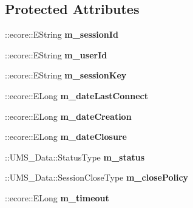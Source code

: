 \subsection*{Protected Attributes}
\begin{DoxyCompactItemize}
\item 
\hypertarget{classUMS__Data_1_1Session_a818bddf0c1cd06b4d1479383e20f8fe5}{
::ecore::EString {\bfseries m\_\-sessionId}}
\label{classUMS__Data_1_1Session_a818bddf0c1cd06b4d1479383e20f8fe5}

\item 
\hypertarget{classUMS__Data_1_1Session_adfed520cb5a119a166a1309a6a797b3b}{
::ecore::EString {\bfseries m\_\-userId}}
\label{classUMS__Data_1_1Session_adfed520cb5a119a166a1309a6a797b3b}

\item 
\hypertarget{classUMS__Data_1_1Session_a3aacdfc9e0b004f6fa33388029a03b51}{
::ecore::EString {\bfseries m\_\-sessionKey}}
\label{classUMS__Data_1_1Session_a3aacdfc9e0b004f6fa33388029a03b51}

\item 
\hypertarget{classUMS__Data_1_1Session_aa59b90679c763eb33b2cdc472a7c68b5}{
::ecore::ELong {\bfseries m\_\-dateLastConnect}}
\label{classUMS__Data_1_1Session_aa59b90679c763eb33b2cdc472a7c68b5}

\item 
\hypertarget{classUMS__Data_1_1Session_af1af87d5aed98bd242fc08edb12819bf}{
::ecore::ELong {\bfseries m\_\-dateCreation}}
\label{classUMS__Data_1_1Session_af1af87d5aed98bd242fc08edb12819bf}

\item 
\hypertarget{classUMS__Data_1_1Session_af176360c56c11cde5b7230612ed53e05}{
::ecore::ELong {\bfseries m\_\-dateClosure}}
\label{classUMS__Data_1_1Session_af176360c56c11cde5b7230612ed53e05}

\item 
\hypertarget{classUMS__Data_1_1Session_a7e2a454f55b7b3a766432016ff44fad8}{
::UMS\_\-Data::StatusType {\bfseries m\_\-status}}
\label{classUMS__Data_1_1Session_a7e2a454f55b7b3a766432016ff44fad8}

\item 
\hypertarget{classUMS__Data_1_1Session_a84c8a76bdf2dc228deb5e106e441980b}{
::UMS\_\-Data::SessionCloseType {\bfseries m\_\-closePolicy}}
\label{classUMS__Data_1_1Session_a84c8a76bdf2dc228deb5e106e441980b}

\item 
\hypertarget{classUMS__Data_1_1Session_ab98511e4e43216792485f76a01933fbe}{
::ecore::ELong {\bfseries m\_\-timeout}}
\label{classUMS__Data_1_1Session_ab98511e4e43216792485f76a01933fbe}

\end{DoxyCompactItemize}


